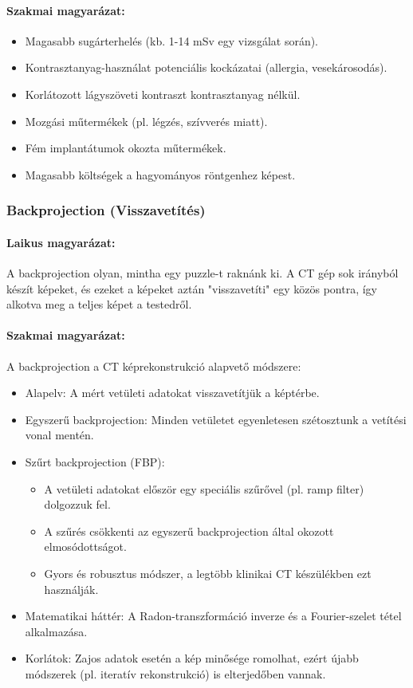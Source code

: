 \documentclass[a4paper,12pt]{article}
\begin{document}
\paragraph{Szakmai magyarázat:} \begin{itemize} \item Magasabb sugárterhelés (kb. 1-14 mSv egy vizsgálat során). \item Kontrasztanyag-használat potenciális kockázatai (allergia, vesekárosodás). \item Korlátozott lágyszöveti kontraszt kontrasztanyag nélkül. \item Mozgási műtermékek (pl. légzés, szívverés miatt). \item Fém implantátumok okozta műtermékek. \item Magasabb költségek a hagyományos röntgenhez képest. \end{itemize}

\subsubsection{Backprojection (Visszavetítés)}

\paragraph{Laikus magyarázat:} A backprojection olyan, mintha egy puzzle-t raknánk ki. A CT gép sok irányból készít képeket, és ezeket a képeket aztán "visszavetíti" egy közös pontra, így alkotva meg a teljes képet a testedről.

\paragraph{Szakmai magyarázat:} A backprojection a CT képrekonstrukció alapvető módszere:

\begin{itemize} \item Alapelv: A mért vetületi adatokat visszavetítjük a képtérbe. \item Egyszerű backprojection: Minden vetületet egyenletesen szétosztunk a vetítési vonal mentén. \item Szűrt backprojection (FBP): \begin{itemize} \item A vetületi adatokat először egy speciális szűrővel (pl. ramp filter) dolgozzuk fel. \item A szűrés csökkenti az egyszerű backprojection által okozott elmosódottságot. \item Gyors és robusztus módszer, a legtöbb klinikai CT készülékben ezt használják. \end{itemize} \item Matematikai háttér: A Radon-transzformáció inverze és a Fourier-szelet tétel alkalmazása. \item Korlátok: Zajos adatok esetén a kép minősége romolhat, ezért újabb módszerek (pl. iteratív rekonstrukció) is elterjedőben vannak. \end{itemize}
\end{document}
